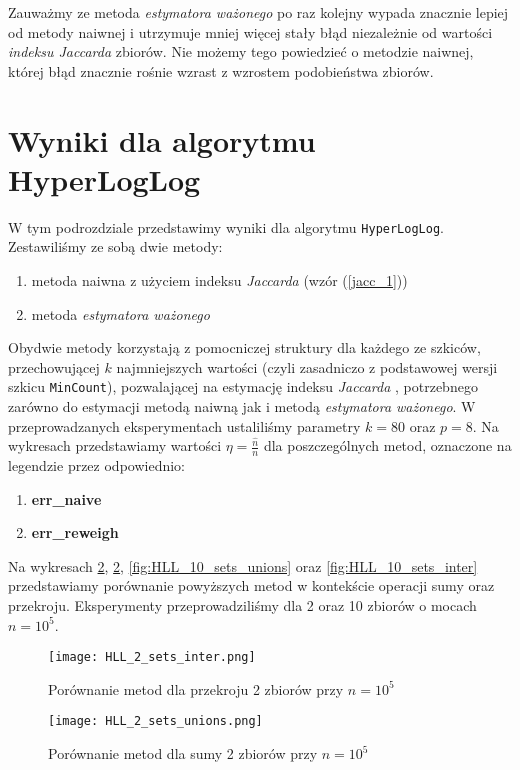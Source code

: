 Zauważmy ze metoda \textit{estymatora ważonego} po raz kolejny wypada znacznie lepiej od metody naiwnej i utrzymuje mniej więcej stały błąd niezależnie od wartości \textit{indeksu Jaccarda} zbiorów. Nie możemy tego powiedzieć o metodzie naiwnej, której błąd znacznie rośnie wzrast z wzrostem podobieństwa zbiorów.

\newpage
\section{Wyniki dla algorytmu HyperLogLog}
W tym podrozdziale przedstawimy wyniki dla algorytmu \texttt{HyperLogLog}. Zestawiliśmy ze sobą dwie metody:
\begin{enumerate}
	\item metoda naiwna z użyciem indeksu \textit{Jaccarda} (wzór (\ref{jacc_1}))
	\item metoda \textit{estymatora ważonego}
\end{enumerate}
Obydwie metody korzystają z pomocniczej struktury dla każdego ze szkiców, przechowującej $k$ najmniejszych wartości (czyli zasadniczo z podstawowej wersji szkicu \texttt{MinCount}), pozwalającej na estymację indeksu \textit{Jaccarda} \cite{adroll}, potrzebnego zarówno do estymacji metodą naiwną jak i metodą \textit{estymatora ważonego}. W przeprowadzanych eksperymentach ustaliliśmy parametry $k = 80$ oraz $p = 8$.
Na wykresach przedstawiamy wartości $\eta = \frac{\hat{n}}{n}$ dla poszczególnych metod, oznaczone na legendzie przez odpowiednio:
\begin{enumerate}
	\item \textbf{err\_naive}
	\item \textbf{err\_reweigh}
\end{enumerate}

Na wykresach \ref{fig:HLL_2_sets_unions}, \ref{fig:HLL_2_sets_unions}, \ref{fig:HLL_10_sets_unions} oraz \ref{fig:HLL_10_sets_inter} przedstawiamy porównanie powyższych metod w kontekście operacji sumy oraz przekroju. Eksperymenty przeprowadziliśmy dla 2 oraz 10 zbiorów o mocach $n=10^5$.

\begin{figure}[h!]
	\texttt{[image: HLL\_2\_sets\_inter.png]}
	\centering
	\caption{Porównanie metod dla przekroju 2 zbiorów przy $n=10^5$}
	\label{fig:HLL_2_sets_inter}
\end{figure}

\begin{figure}[h!]
	\texttt{[image: HLL\_2\_sets\_unions.png]}
	\centering
	\caption{Porównanie metod dla sumy 2 zbiorów przy $n=10^5$}
	\label{fig:HLL_2_sets_unions}
\end{figure}

